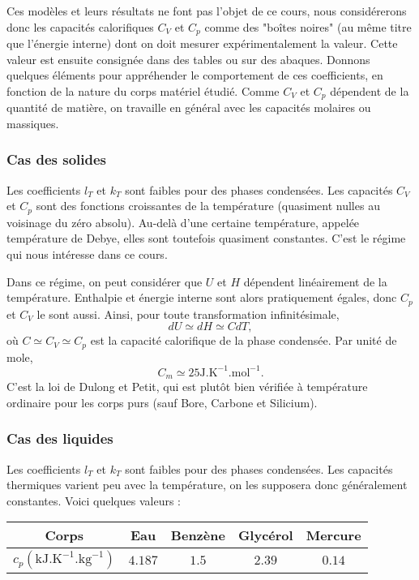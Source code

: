 \documentclass[11pt,a4paper]{report}
\begin{document}
Ces modèles et leurs résultats ne font pas l'objet de ce cours, nous considérerons donc les capacités calorifiques $C_V$ et $C_p$ comme des "boîtes noires" (au même titre que l'énergie interne) dont on doit mesurer expérimentalement la valeur. Cette valeur est ensuite consignée dans des tables ou sur des abaques. Donnons quelques éléments pour appréhender le comportement de ces coefficients, en fonction de la nature du corps matériel étudié. Comme $C_V$ et $C_p$ dépendent de la quantité de matière, on travaille en général avec les capacités molaires ou massiques.

\subsubsection{Cas des solides}

Les coefficients $l_T$ et $k_T$ sont faibles pour des phases condensées. Les capacités $C_V$ et $C_p$ sont des fonctions croissantes de la température (quasiment nulles au voisinage du zéro absolu). Au-delà d'une certaine température, appelée température de Debye, elles sont toutefois quasiment constantes. C'est le régime qui nous intéresse dans ce cours.

Dans ce régime, on peut considérer que $U$ et $H$ dépendent linéairement de la température. Enthalpie et énergie interne sont alors pratiquement égales, donc $C_p$ et $C_V$ le sont aussi. Ainsi, pour toute transformation infinitésimale,
\begin{equation}
	dU \simeq dH \simeq C dT,
\end{equation}
où $C \simeq C_V \simeq C_p$ est la capacité calorifique de la phase condensée. Par unité de mole,
\begin{equation}
	C_{m}\simeq 25\text{J}.\text{K}^{-1}.\text{mol}^{-1}.
\end{equation}
C'est la loi de Dulong et Petit, qui est plutôt bien vérifiée à température ordinaire pour les corps purs (sauf Bore, Carbone et Silicium).

\subsubsection{Cas des liquides}

Les coefficients $l_T$ et $k_T$ sont faibles pour des phases condensées. Les capacités thermiques varient peu avec la température, on les supposera donc généralement constantes. Voici quelques valeurs :

\begin{center}
\begin{tabular}{|c|c|c|c|c|}
  \hline
  Corps & Eau & Benzène & Glycérol & Mercure\\
  \hline
  $c_p (\text{kJ}.\text{K}^{-1}.\text{kg}^{-1})$ & $4.187$ & $1.5$ & $2.39$ & $0.14$\\
  \hline
\end{tabular}
\end{center}
\end{document}
